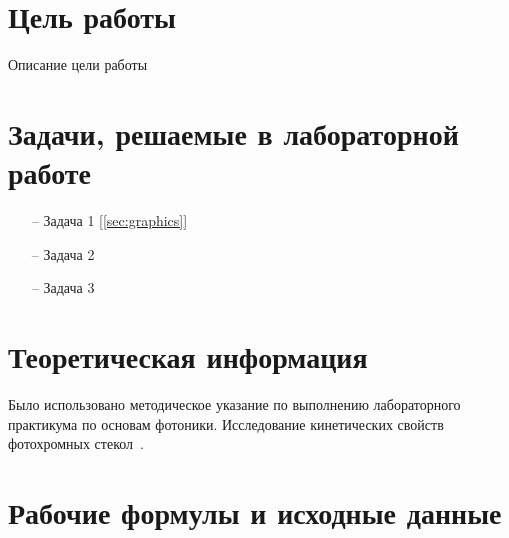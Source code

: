 
\section{Цель работы}\label{sec:purpose}

Описание цели работы

\section{Задачи, решаемые в лабораторной работе}\label{sec:tasks}

\begin{itemize}
\item[--] Задача 1 [\ref{sec:graphics}]
\item[--] Задача 2
\item[--] Задача 3
\end{itemize}

\section{Теоретическая информация}\label{sec:теоретическая-информация}

Было использовано методическое указание по выполнению лабораторного практикума по основам фотоники.
Исследование кинетических свойств фотохромных стекол~\cite{conlan1983massive}.

\section{Рабочие формулы и исходные данные}\label{sec:initial_data}

